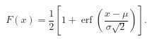 \begin{equation*}[niji=false]
 F(x)=\frac12\left[
 1+\operatorname{erf}\left(
 \frac{x-\mu}{\sigma\sqrt2}
 \right)\right].
\end{equation*}
